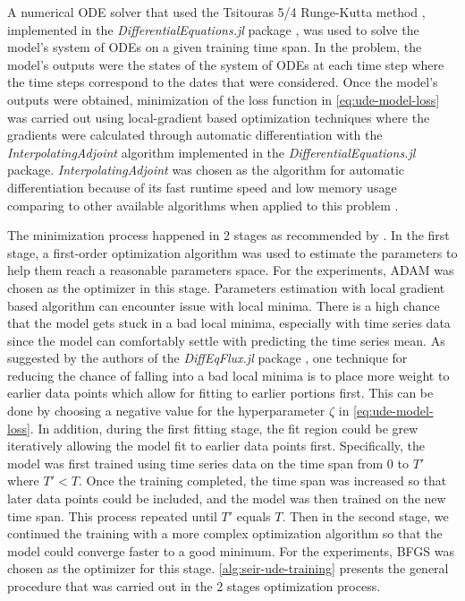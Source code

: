 A numerical \gls{ODE} solver that used the Tsitouras 5/4 Runge-Kutta method \cite{tsitourasRungeKuttaPairs2011}, implemented in the \textit{DifferentialEquations.jl} package \cite{rackauckas2017differentialequations}, was used to solve the model's system of \glspl{ODE} on a given training time span.
In the problem, the model's outputs were the states of the system of \glspl{ODE} at each time step where the time steps correspond to the dates that were considered.
Once the model's outputs were obtained, minimization of the loss function in \autoref{eq:ude-model-loss} was carried out using local-gradient based optimization techniques where the gradients were calculated through automatic differentiation with the \textit{InterpolatingAdjoint} algorithm implemented in the \textit{DifferentialEquations.jl} package.
\textit{InterpolatingAdjoint} was chosen as the algorithm for automatic differentiation because of its fast runtime speed and low memory usage comparing to other available algorithms when applied to this problem \cite{rackauckas2017differentialequations}.

The minimization process happened in 2 stages as recommended by \cite{rackauckasUniversalDifferentialEquations2020}.
In the first stage, a first-order optimization algorithm was used to estimate the parameters to help them reach a reasonable parameters space.
For the experiments, ADAM \cite{kingmaAdamMethodStochastic2017} was chosen as the optimizer in this stage.
Parameters estimation with local gradient based algorithm can encounter issue with local minima.
There is a high chance that the model gets stuck in a bad local minima, especially with time series data since the model can comfortably settle with predicting the time series mean.
As suggested by the authors of the \textit{DiffEqFlux.jl} package \cite{rackauckasUniversalDifferentialEquations2020}, one technique for reducing the chance of falling into a bad local minima is to place more weight to earlier data points which allow for fitting to earlier portions first.
This can be done by choosing a negative value for the hyperparameter $\zeta$ in \autoref{eq:ude-model-loss}.
In addition, during the first fitting stage, the fit region could be grew iteratively allowing the model fit to earlier data points first.
Specifically, the model was first trained using time series data on the time span from $0$ to $T'$ where $T' < T$.
Once the training completed, the time span was increased so that later data points could be included, and the model was then trained on the new time span.
This process repeated until $T'$ equals $T$.
Then in the second stage, we continued the training with a more complex optimization algorithm so that the model could converge faster to a good minimum.
For the experiments, BFGS \cite{broydenConvergenceClassDoublerank1970, fletcherNewApproachVariable1970, goldfarbFamilyVariablemetricMethods1970, shannoConditioningQuasiNewtonMethods1970} was chosen as the optimizer for this stage.
\autoref{alg:seir-ude-training} presents the general procedure that was carried out in the 2 stages optimization process.

